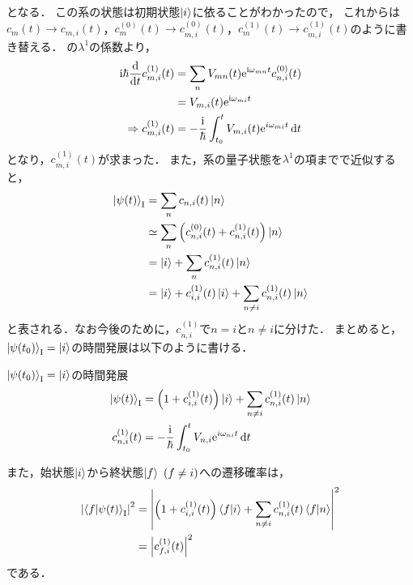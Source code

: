 \documentclass{report}
\begin{document}
  となる．
  この系の状態は初期状態$\ket{i}$に依ることがわかったので，
  これからは$c_m(t) \to c_{m, i}(t)$，$c_m^{(0)}(t) \to c_{m, i}^{(0)}(t)$，$c_m^{(1)}(t) \to c_{m, i}^{(1)}(t)$のように書き替える．
  の$\lambda^1$の係数より，
  \begin{align}
    \mathrm{i}\hbar\dv{t}c_{m, i}^{(1)}(t)& = \sum_{n}V_{mn}(t)\mathrm{e}^{\mathrm{i}\omega_{mn}t}c_{n, i}^{(0)}(t)\\
    & = V_{m, i}(t)\mathrm{e}^{\mathrm{i}\omega_{mi}t} \\
    \Rightarrow c_{m, i}^{(1)}(t)& = -\frac{\mathrm{i}}{\hbar}\int_{t_0}^{t}V_{m, i}(t)\mathrm{e}^{i\omega_{mi}t}\dd{t}
  \end{align}
  となり，$c_{m, i}^{(1)}(t)$が求まった．
  また，系の量子状態を$\lambda^1$の項までで近似すると，
  \begin{align}
    \ket{\psi(t)}_{\mathrm{I}} &= \sum_{n}c_{n, i}(t)\ket{n} \\ 
    &\simeq \sum_{n} \qty(c_{n, i}^{(0)}(t) + c_{n, i}^{(1)}(t))\ket{n} \\ 
    &= \ket{i} + \sum_{n}c_{n, i}^{(1)}(t)\ket{n} \\ 
    &= \ket{i} + c_{i, i}^{(1)}(t)\ket{i} + \sum_{n\neq i}c_{n, i}^{(1)}(t)\ket{n}
  \end{align}
  と表される．なお今後のために，$c_{n, i}^{(1)}$で$n = i$と$n \neq i$に分けた．
  まとめると，$\ket{\psi(t_0)}_{\mathrm{I}} = \ket{i}$の時間発展は以下のように書ける．
  \begin{itembox}[l]{$\ket{\psi(t_0)}_{\mathrm{I}} = \ket{i}$の時間発展}
    \begin{align}
      \ket{\psi(t)}_{\mathrm{I}}& = \qty(1 + c_{i, i}^{(1)}(t))\ket{i} + \sum_{n\neq i}c_{n, i}^{(1)}(t)\ket{n}\\
      c_{n, i}^{(1)}(t) &= -\frac{\mathrm{i}}{\hbar}\int_{t_0}^{t}V_{n, i}\mathrm{e}^{i\omega_{ni}t}\dd{t}
    \end{align}
  \end{itembox}
  また，始状態$\ket{i}$から終状態$\ket{f}\ (f\neq i)$への遷移確率は，
  \begin{align}
    \abs{\braket{f}{\psi(t)}_{\mathrm{I}}}^2 &= \abs{\qty(1 + c_{i, i}^{(1)}(t))\braket{f}{i} + \sum_{n\neq i}c_{n, i}^{(1)}(t)\braket{f}{n}}^2 \\ 
    &= \abs{c_{f, i}^{(1)}(t)}^2
  \end{align}
  である．
\end{document}
